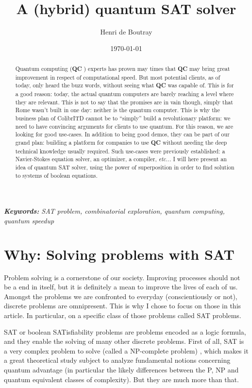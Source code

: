 \documentclass{article}
\title{A (hybrid) quantum SAT solver}
\author{Henri de Boutray}
\date{\today}
\def\QC{\textbf{QC} }
\begin{document}
\maketitle

\begin{abstract}
Quantum computing (\QC) experts has proven may times that \QC may bring great
improvement in respect of computational speed. But most potential clients, as of
today, only heard the buzz words, without seeing what \QC was capable of. This
is for a good reason: today, the actual quantum computers are barely reaching a
level where they are relevant. This is not to say that the promises are in vain
though, simply that Rome wasn't built in one day: neither is the quantum
computer. This is why the business plan of ColibrITD cannot be to ``simply''
build a revolutionary platform: we need to have convincing arguments for clients
to use quantum. For this reason, we are looking for good use-cases. In addition
to being good demos, they can be part of our grand plan: building a platform for
companies to use \QC without needing the deep technical knowledge usually
required. Such use-cases were previously established: a Navier-Stokes equation
solver, an optimizer, a compiler, \emph{etc...} I will here present an idea of
quantum SAT solver, using the power of superposition in order to find solution
to systems of boolean equations.
\end{abstract}

\begin{center}
\emph{
\textbf{Keywords:} SAT problem, combinatorial exploration, quantum computing,
quantum speedup
}
\end{center}

\section{Why: Solving problems with SAT}
\label{sec:solving_problems_with_sat}

Problem solving is a cornerstone of our society. Improving processes should not
be a end in itself, but it is definitely a mean to improve the lives of each of
us. Amongst the problems we are confronted to everyday (conscientiously or not),
discrete problems are omnipresent. This is why I chose to focus on those in this
article. In particular, on a specific class of those problems called SAT
problems.

SAT or boolean SATisfiability problems are problems encoded as a logic formula,
and they enable the solving of many other discrete problems. First of all, SAT is
a very complex problem to solve (called a NP-complete problem) \cite{Coo71}, 
which makes it a great theoretical study subject to analyze fundamental notions
concerning quantum advantage (in particular the likely differences between the P,
NP and quantum equivalent classes of complexity). But they are much more than
that.
\end{document}
